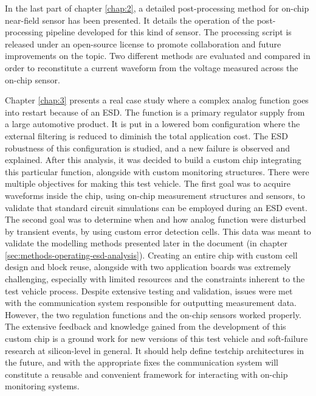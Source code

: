 In the last part of chapter \ref{chap:2}, a detailed post-processing method for on-chip near-field sensor has been presented.
It details the operation of the post-processing pipeline developed for this kind of sensor.
The processing script is released \cite{nfs-repository} under an open-source license to promote collaboration and future improvements on the topic.
Two different methods are evaluated and compared in order to reconstitute a current waveform from the voltage measured across the on-chip sensor.

Chapter \ref{chap:3} presents a real case study where a complex analog function goes into restart because of an ESD.
The function is a primary regulator supply from a large automotive product.
It is put in a lowered \gls{bom} configuration where the external filtering is reduced to diminish the total application cost.
The ESD robustness of this configuration is studied, and a new failure is observed and explained.
After this analysis, it was decided to build a custom chip integrating this particular function, alongside with custom monitoring structures.
There were multiple objectives for making this test vehicle.
The first goal was to acquire waveforms inside the chip, using on-chip measurement structures and sensors, to validate that standard circuit simulations can be employed during an ESD event.
The second goal was to determine when and how analog function were disturbed by transient events, by using custom error detection cells.
This data was meant to validate the modelling methods presented later in the document (in chapter \ref{sec:methods-operating-esd-analysis}).
Creating an entire chip with custom cell design and block reuse, alongside with two application boards was extremely challenging, especially with limited resources and the constraints inherent to the test vehicle process.
Despite extensive testing and validation, issues were met with the communication system responsible for outputting measurement data.
However, the two regulation functions and the on-chip sensors worked properly.
The extensive feedback and knowledge gained from the development of this custom chip is a ground work for new versions of this test vehicle and soft-failure research at silicon-level in general.
It should help define testchip architectures in the future, and with the appropriate fixes the communication system will constitute a reusable and convenient framework for interacting with on-chip monitoring systems.

